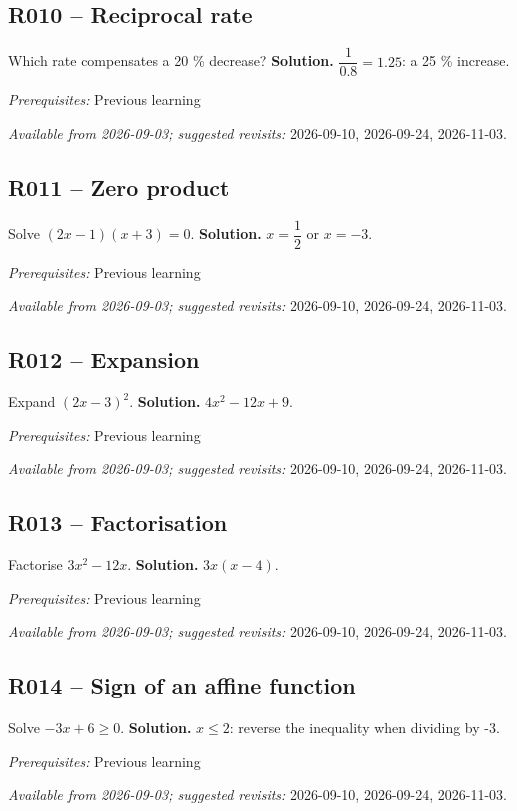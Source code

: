 \subsection*{R010 -- Reciprocal rate}\label{R010}
Which rate compensates a 20 \% decrease?
\ifprof\textbf{Solution.} $\dfrac{1}{0.8}=1.25$: a 25 \% increase.\par\textit{Prerequisites:} Previous learning\par\textit{Available from 2026-09-03; suggested revisits:} 2026-09-10, 2026-09-24, 2026-11-03.\fi
{}\subsection*{R011 -- Zero product}\label{R011}
Solve $(2x-1)(x+3)=0$.
\ifprof\textbf{Solution.} $x=\dfrac{1}{2}$ or $x=-3$.\par\textit{Prerequisites:} Previous learning\par\textit{Available from 2026-09-03; suggested revisits:} 2026-09-10, 2026-09-24, 2026-11-03.\fi
{}\subsection*{R012 -- Expansion}\label{R012}
Expand $(2x-3)^2$.
\ifprof\textbf{Solution.} $4x^2-12x+9$.\par\textit{Prerequisites:} Previous learning\par\textit{Available from 2026-09-03; suggested revisits:} 2026-09-10, 2026-09-24, 2026-11-03.\fi
{}\subsection*{R013 -- Factorisation}\label{R013}
Factorise $3x^2-12x$.
\ifprof\textbf{Solution.} $3x(x-4)$.\par\textit{Prerequisites:} Previous learning\par\textit{Available from 2026-09-03; suggested revisits:} 2026-09-10, 2026-09-24, 2026-11-03.\fi
{}\subsection*{R014 -- Sign of an affine function}\label{R014}
Solve $-3x+6\geq0$.
\ifprof\textbf{Solution.} $x\leq2$: reverse the inequality when dividing by -3.\par\textit{Prerequisites:} Previous learning\par\textit{Available from 2026-09-03; suggested revisits:} 2026-09-10, 2026-09-24, 2026-11-03.\fi
